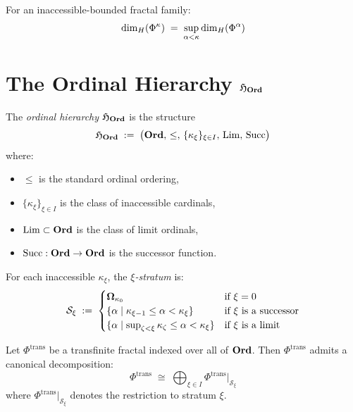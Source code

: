 \begin{corollary}
\label{cor:inacc-dim}
For an inaccessible-bounded fractal family:
\[
    \dim_H(\Phi^{\kappa}) \;=\; \sup_{\alpha < \kappa}
    \dim_H(\Phi^{\alpha})
\]
\end{corollary}

\section{The Ordinal Hierarchy $\mathfrak{H}_{\mathbf{Ord}}$}

\begin{definition}
\label{def:ord-hierarchy}
The \emph{ordinal hierarchy} $\mathfrak{H}_{\mathbf{Ord}}$ is the structure
\[
    \mathfrak{H}_{\mathbf{Ord}} \;:=\; \bigl(\mathbf{Ord},\, \leq,\, \{\kappa_\xi\}_{\xi \in I},\,
    \mathrm{Lim},\, \mathrm{Succ}\bigr)
\]
where:
\begin{itemize}
    \item $\leq$ is the standard ordinal ordering,
    \item $\{\kappa_\xi\}_{\xi \in I}$ is the class of inaccessible cardinals,
    \item $\mathrm{Lim} \subset \mathbf{Ord}$ is the class of limit ordinals,
    \item $\mathrm{Succ}: \mathbf{Ord} \to \mathbf{Ord}$ is the successor function.
\end{itemize}
\end{definition}

\begin{definition}
\label{def:strata}
For each inaccessible $\kappa_\xi$, the \emph{$\xi$-stratum} is:
\[
    \mathcal{S}_\xi \;:=\;
    \begin{cases}
        \boldsymbol{\Omega}_{\kappa_0} & \text{if } \xi = 0 \\
        \{\alpha \mid \kappa_{\xi-1} \leq \alpha < \kappa_\xi\} &
        \text{if } \xi \text{ is a successor} \\
        \{\alpha \mid \sup_{\zeta < \xi} \kappa_\zeta \leq \alpha < \kappa_\xi\}
        & \text{if } \xi \text{ is a limit}
    \end{cases}
\]
\end{definition}

\begin{theorem}
\label{thm:stratified-decomp}
Let $\Phi^{\mathrm{trans}}$ be a transfinite fractal indexed over all of $\mathbf{Ord}$. Then
$\Phi^{\mathrm{trans}}$ admits a canonical decomposition:
\[
    \Phi^{\mathrm{trans}} \;\cong\; \bigoplus_{\xi \in I} \Phi^{\mathrm{trans}}|_{\mathcal{S}_\xi}
\]
where $\Phi^{\mathrm{trans}}|_{\mathcal{S}_\xi}$ denotes the restriction to stratum $\xi$.
\end{theorem}

